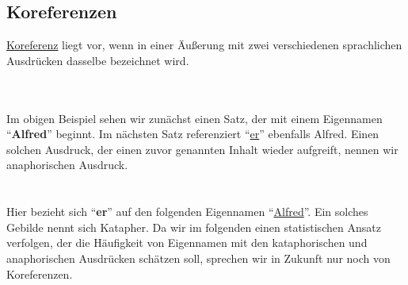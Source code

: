 \subsection{Koreferenzen}

\begin{defi}
	\underline{Koreferenz} liegt vor, wenn in einer Äußerung mit zwei verschiedenen sprachlichen Ausdrücken dasselbe bezeichnet wird. \cite{wiki:Koreferenz}
\end{defi}

\\
\\
Im obigen Beispiel sehen wir zunächst einen Satz, der mit einem Eigennamen ``\textbf{Alfred}'' beginnt. Im nächsten Satz referenziert ``\underline{er}'' ebenfalls Alfred. Einen solchen Ausdruck, der einen zuvor genannten Inhalt wieder aufgreift, nennen wir anaphorischen Ausdruck.\\
\\
\\
Hier bezieht sich ``\textbf{er}'' auf den folgenden Eigennamen ``\underline{Alfred}''. Ein solches Gebilde nennt sich Katapher. Da wir im folgenden einen statistischen Ansatz verfolgen, der die Häufigkeit von Eigennamen mit den kataphorischen und anaphorischen Ausdrücken schätzen soll, sprechen wir in Zukunft nur noch von Koreferenzen.
